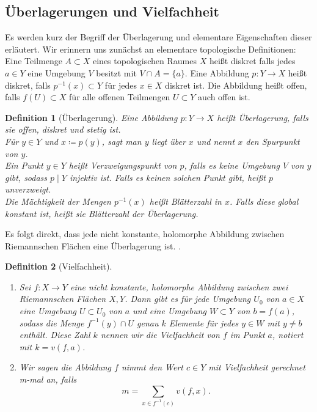 \documentclass[11pt,a4paper,toc=bibliography]{scrartcl}
\theoremstyle{thm}
\theoremstyle{def}
\newtheorem{defi}{Definition}[section]
\theoremstyle{remark}
\begin{document}
\subsection{Überlagerungen und Vielfachheit}
Es werden kurz der Begriff der Überlagerung und elementare Eigenschaften dieser erläutert. Wir erinnern uns zunächst an elementare topologische Definitionen:\\
Eine Teilmenge $A\subset X$ eines topologischen Raumes $X$ heißt diskret falls jedes $a\in Y$ eine Umgebung $V$ besitzt mit $V\cap A= \{a\}$. Eine Abbildung $p:Y\rightarrow X$ heißt diskret, falls $p^{-1}(x)\subset Y$  für jedes $x\in X$ diskret ist. Die Abbildung heißt offen, falls $f(U)\subset X$ für alle offenen Teilmengen $U\subset Y$ auch offen ist.
\begin{defi}[Überlagerung]
Eine Abbildung $p:Y\rightarrow X$ heißt \emph{Überlagerung}, falls sie offen, diskret und stetig ist.\\
Für $y\in Y$ und $x\coloneqq p(y)$, sagt man \emph{$y$ liegt über $x$} und nennt $x$ den \emph{Spurpunkt} von $y$.\\
Ein Punkt $y\in Y$ heißt \emph{Verzweigungspunkt} von $p$, falls es keine Umgebung $V$ von $y$ gibt, sodass $p\mid Y$ injektiv ist. Falls es keinen solchen Punkt gibt, heißt $p$ \emph{unverzweigt}.\\
Die Mächtigkeit der Mengen $p^{-1}(x)$ heißt \emph{Blätterzahl in $x$}. Falls diese global konstant ist, heißt sie \emph{Blätterzahl} der Überlagerung.
\end{defi}
Es folgt direkt, dass jede nicht konstante, holomorphe Abbildung zwischen Riemannschen Flächen eine Überlagerung ist. \cite[S.18]{forster}.
\begin{defi}[Vielfachheit]
\begin{enumerate}
    \item
    Sei $f:X\rightarrow Y$ eine nicht konstante, holomorphe Abbildung zwischen zwei Riemannschen Flächen $X,Y$. Dann gibt es für jede Umgebung $U_0$ von $a\in X$ eine Umgebung $U\subset U_0$ von $a$ und eine Umgebung $W\subset Y$ von $b=f(a)$, sodass die Menge $f^{-1}(y)\cap U$ genau $k$ Elemente für jedes $y\in W$ mit $y\neq b$ enthält. Diese Zahl $k$ nennen wir die \emph{Vielfachheit} von $f$ im Punkt $a$, notiert mit $k=v(f,a)$.
    \item
    Wir sagen die Abbildung $f$ nimmt den Wert $c\in Y$ \emph{mit Vielfachheit gerechnet m-mal} an, falls
    \[
    m =\sum_{x\in f^{-1}(c)} v(f,x).
    \]
    \end{enumerate}
\end{defi}
\end{document}
